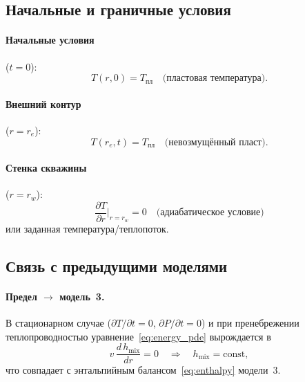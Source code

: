 \documentclass[12pt,a4paper]{article}
\begin{document}
\subsection{Начальные и граничные условия}

\paragraph{Начальные условия} ($t = 0$):
\begin{equation}\label{eq:IC}
  T(r, 0) = T_{\text{пл}} \quad \text{(пластовая температура)}.
\end{equation}

\paragraph{Внешний контур} ($r = r_e$):
\begin{equation}\label{eq:BC_re}
  T(r_e, t) = T_{\text{пл}} \quad \text{(невозмущённый пласт)}.
\end{equation}

\paragraph{Стенка скважины} ($r = r_w$):
\begin{equation}\label{eq:BC_rw}
  \frac{\partial T}{\partial r}\bigg|_{r=r_w} = 0 \quad
  \text{(адиабатическое условие)}
\end{equation}
или заданная температура/теплопоток.

\subsection{Связь с предыдущими моделями}

\paragraph{Предел $\to$ модель~3.}
В стационарном случае ($\partial T/\partial t = 0$,
$\partial P/\partial t = 0$) и при пренебрежении теплопроводностью
уравнение~\eqref{eq:energy_pde} вырождается в
\begin{equation}
  v\,\frac{d\,h_{\mathrm{mix}}}{dr} = 0
  \quad\Longrightarrow\quad
  h_{\mathrm{mix}} = \mathrm{const},
\end{equation}
что совпадает с энтальпийным балансом~\eqref{eq:enthalpy} модели~3.
\end{document}
